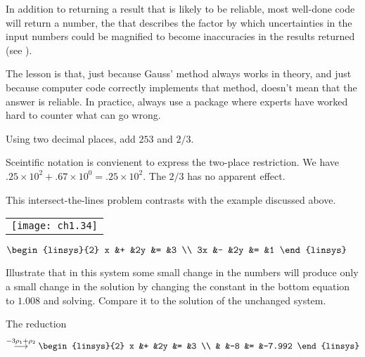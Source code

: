 In addition to returning a result that is likely to be reliable,
most well-done code will return a number, the 
%
that describes the factor by which uncertainties in the input numbers
could be magnified to become inaccuracies in the results returned 
(see \cite{Rice}).

The lesson is that,
just because Gauss' method always works in theory, and just
because computer code correctly implements that method,
doesn't mean that the answer is reliable.
In practice, always use a package
where experts have worked hard to counter what can go wrong.

\begin{exercises}
  \item 
    Using two decimal places, add $253$ and $2/3$.
    \begin{answer}
      Sceintific notation is convienent to express the two-place restriction.
      We have $.25\times 10^{2}+.67\times 10^{0}=.25\times 10^{2}$.
      The $2/3$ has no apparent effect.
    \end{answer}
  \item 
    This intersect-the-lines problem contrasts with the example
    discussed above.
    \begin{center}
      \begin{tabular}{@{}c@{}}
        \texttt{[image: ch1.34]}
      \end{tabular}
      \qquad
      $\displaystyle \begin{linsys}{2}
            x &+ &2y &= &3  \\
            3x &- &2y &= &1
      \end{linsys}$
    \end{center}
    Illustrate that in this system 
    some small change in the numbers will produce only a
    small change in the solution by changing the constant in the
    bottom equation to $1.008$ and solving.
    Compare it to the solution of the unchanged system.
    \begin{answer}
      The reduction
      \begin{equation*}
        \grstep{-3\rho_1+\rho_2}
        \begin{linsys}{2}
          x  &+  &2y  &=  &3  \\
             &   &-8  &=  &-7.992
        \end{linsys}
      \end{equation*}

\end{answer}
\end{exercises}
